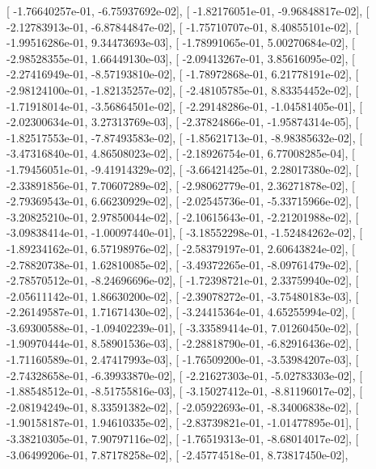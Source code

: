 \documentclass{article}
\begin{document}
       [ -1.76640257e-01,  -6.75937692e-02],
       [ -1.82176051e-01,  -9.96848817e-02],
       [ -2.12783913e-01,  -6.87844847e-02],
       [ -1.75710707e-01,   8.40855101e-02],
       [ -1.99516286e-01,   9.34473693e-03],
       [ -1.78991065e-01,   5.00270684e-02],
       [ -2.98528355e-01,   1.66449130e-03],
       [ -2.09413267e-01,   3.85616095e-02],
       [ -2.27416949e-01,  -8.57193810e-02],
       [ -1.78972868e-01,   6.21778191e-02],
       [ -2.98124100e-01,  -1.82135257e-02],
       [ -2.48105785e-01,   8.83354452e-02],
       [ -1.71918014e-01,  -3.56864501e-02],
       [ -2.29148286e-01,  -1.04581405e-01],
       [ -2.02300634e-01,   3.27313769e-03],
       [ -2.37824866e-01,  -1.95874314e-05],
       [ -1.82517553e-01,  -7.87493583e-02],
       [ -1.85621713e-01,  -8.98385632e-02],
       [ -3.47316840e-01,   4.86508023e-02],
       [ -2.18926754e-01,   6.77008285e-04],
       [ -1.79456051e-01,  -9.41914329e-02],
       [ -3.66421425e-01,   2.28017380e-02],
       [ -2.33891856e-01,   7.70607289e-02],
       [ -2.98062779e-01,   2.36271878e-02],
       [ -2.79369543e-01,   6.66230929e-02],
       [ -2.02545736e-01,  -5.33715966e-02],
       [ -3.20825210e-01,   2.97850044e-02],
       [ -2.10615643e-01,  -2.21201988e-02],
       [ -3.09838414e-01,  -1.00097440e-01],
       [ -3.18552298e-01,  -1.52484262e-02],
       [ -1.89234162e-01,   6.57198976e-02],
       [ -2.58379197e-01,   2.60643824e-02],
       [ -2.78820738e-01,   1.62810085e-02],
       [ -3.49372265e-01,  -8.09761479e-02],
       [ -2.78570512e-01,  -8.24696696e-02],
       [ -1.72398721e-01,   2.33759940e-02],
       [ -2.05611142e-01,   1.86630200e-02],
       [ -2.39078272e-01,  -3.75480183e-03],
       [ -2.26149587e-01,   1.71671430e-02],
       [ -3.24415364e-01,   4.65255994e-02],
       [ -3.69300588e-01,  -1.09402239e-01],
       [ -3.33589414e-01,   7.01260450e-02],
       [ -1.90970444e-01,   8.58901536e-03],
       [ -2.28818790e-01,  -6.82916436e-02],
       [ -1.71160589e-01,   2.47417993e-03],
       [ -1.76509200e-01,  -3.53984207e-03],
       [ -2.74328658e-01,  -6.39933870e-02],
       [ -2.21627303e-01,  -5.02783303e-02],
       [ -1.88548512e-01,  -8.51755816e-03],
       [ -3.15027412e-01,  -8.81196017e-02],
       [ -2.08194249e-01,   8.33591382e-02],
       [ -2.05922693e-01,  -8.34006838e-02],
       [ -1.90158187e-01,   1.94610335e-02],
       [ -2.83739821e-01,  -1.01477895e-01],
       [ -3.38210305e-01,   7.90797116e-02],
       [ -1.76519313e-01,  -8.68014017e-02],
       [ -3.06499206e-01,   7.87178258e-02],
       [ -2.45774518e-01,   8.73817450e-02],
\end{document}
